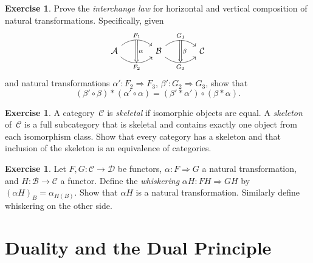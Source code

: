 \documentclass[a4paper,12pt]{book}
\theoremstyle{definition}
\newtheorem{exercise}[definition]{Exercise}
\theoremstyle{plain}
\theoremstyle{remark}
\begin{document}
\begin{exercise}\label{exo:interchange-law}
Prove the \emph{interchange law} for horizontal and vertical
composition of natural transformations.  Specifically, given
\[
\begin{tikzcd}[column sep=large]
    \mathcal{A}
    \arrow[r, bend left=40, "F_1"{name=F1}]
    \arrow[r, bend right=40, "F_2"{name=F2, below}]
    &
    \mathcal{B}
    \arrow[r, bend left=40, "G_1"{name=G1}]
    \arrow[r, bend right=40, "G_2"{name=G2, below}]
    &
    \mathcal{C}
    \arrow[Rightarrow, from=F1, to=F2, "\alpha"]
    \arrow[Rightarrow, from=G1, to=G2, "\beta"]
\end{tikzcd}
\]
and natural transformations $\alpha'\colon F_2\Rightarrow F_3$,
$\beta'\colon G_2\Rightarrow G_3$, show that
\[
    (\beta'\circ\beta)*(\alpha'\circ\alpha)
    = (\beta'*\alpha')\circ(\beta*\alpha).
\]
\end{exercise}

\begin{exercise}\label{exo:skeleton}
A category~$\mathcal{C}$ is \emph{skeletal} if isomorphic objects are
equal.  A \emph{skeleton} of~$\mathcal{C}$ is a full subcategory that
is skeletal and contains exactly one object from each isomorphism class.
Show that every category has a skeleton and that inclusion of the
skeleton is an equivalence of categories.
\end{exercise}

\begin{exercise}\label{exo:nat-trans-precomposition}
Let $F,G\colon\mathcal{C}\to\mathcal{D}$ be functors,
$\alpha\colon F\Rightarrow G$ a natural transformation, and
$H\colon\mathcal{B}\to\mathcal{C}$ a functor.
Define the \emph{whiskering} $\alpha H\colon FH\Rightarrow GH$ by
$(\alpha H)_B = \alpha_{H(B)}$.
Show that $\alpha H$ is a natural transformation.
Similarly define whiskering on the other side.
\end{exercise}




\chapter{Duality and the Dual Principle}\label{ch:duality}
\minitoc
\end{document}
